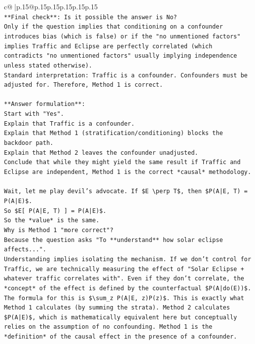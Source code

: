 \documentclass{article}
\begin{document}
{\begin{supertabular}{c@{$\;$}|p{.15\linewidth}@{}p{.15\linewidth}p{.15\linewidth}p{.15\linewidth}p{.15\linewidth}p{.15\linewidth}}
{{{\\ 
\texttt{**Final check**: Is it possible the answer is No?} \\
\texttt{Only if the question implies that conditioning on a confounder introduces bias (which is false) or if the "no unmentioned factors" implies Traffic and Eclipse are perfectly correlated (which contradicts "no unmentioned factors" usually implying independence unless stated otherwise).} \\
\texttt{Standard interpretation: Traffic is a confounder. Confounders must be adjusted for. Therefore, Method 1 is correct.} \\
\\ 
\texttt{**Answer formulation**:} \\
\texttt{Start with "Yes".} \\
\texttt{Explain that Traffic is a confounder.} \\
\texttt{Explain that Method 1 (stratification/conditioning) blocks the backdoor path.} \\
\texttt{Explain that Method 2 leaves the confounder unadjusted.} \\
\texttt{Conclude that while they might yield the same result if Traffic and Eclipse are independent, Method 1 is the correct *causal* methodology.} \\
\\ 
\texttt{Wait, let me play devil's advocate. If \$E \textbackslash{}perp T\$, then \$P(A|E, T) = P(A|E)\$.} \\
\texttt{So \$E{[} P(A|E, T) {]} = P(A|E)\$.} \\
\texttt{So the *value* is the same.} \\
\texttt{Why is Method 1 "more correct"?} \\
\texttt{Because the question asks "To **understand** how solar eclipse affects...".} \\
\texttt{Understanding implies isolating the mechanism. If we don't control for Traffic, we are technically measuring the effect of "Solar Eclipse + whatever traffic correlates with". Even if they don't correlate, the *concept* of the effect is defined by the counterfactual \$P(A|do(E))\$. The formula for this is \$\textbackslash{}sum\_z P(A|E, z)P(z)\$. This is exactly what Method 1 calculates (by summing the strata). Method 2 calculates \$P(A|E)\$, which is mathematically equivalent here but conceptually relies on the assumption of no confounding. Method 1 is the *definition* of the causal effect in the presence of a confounder.} \\
}}}
\end{supertabular}}
\end{document}
